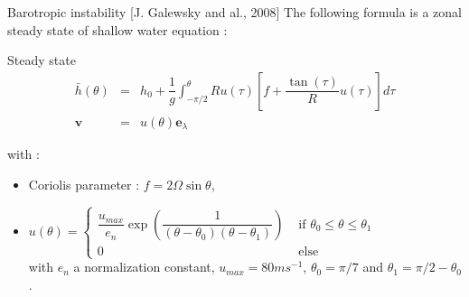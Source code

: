 \documentclass[11pt]{beamer}
\def\gint{\displaystyle\int}
\begin{document}

\begin{frame}{Barotropic instability [J. Galewsky and al., 2008]}
The following formula is a zonal steady state of shallow water equation :

\begin{block}{Steady state}
\begin{equation}
\begin{array}{rcl}
\bar{h}(\theta) & = & h_0 + \dfrac{1}{g}\gint^{\theta}_{-\pi/2} R u(\tau) \left[ f + \dfrac{\tan(\tau)}{R} u(\tau) \right] d \tau \\
\mathbf{v} & = & u(\theta) \mathbf{e}_{\lambda}
\end{array}
\end{equation}
\end{block}

with :

\begin{itemize}
\item Coriolis parameter : $f = 2 \Omega \sin \theta$,
\item $u(\theta)=\left\lbrace
\begin{array}{ll}
\dfrac{u_{max}}{e_n} \exp\left( \dfrac{1}{(\theta-\theta_0)(\theta-\theta_1)} \right) & \text{ if } \theta_0 \leq \theta \leq \theta_1 \\
0 & \text{ else}
\end{array}\right.$\\
 with $e_n$ a normalization constant, $u_{max} = 80 ms^{-1}$, $\theta_0 = \pi/7$ and $\theta_1 = \pi/2 - \theta_0$.
\end{itemize}
\end{frame}
\end{document}
